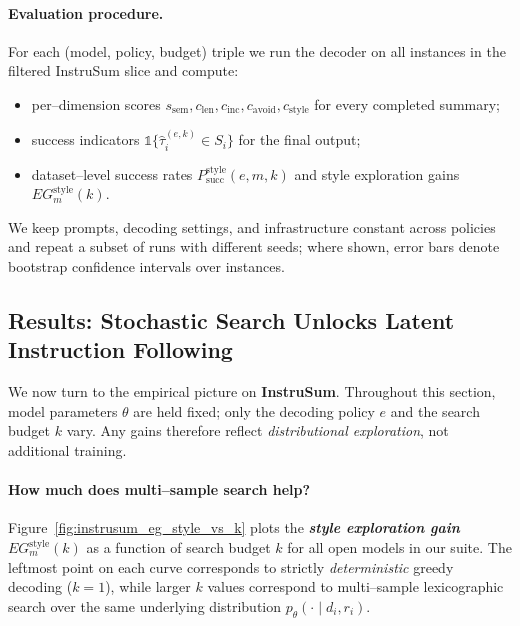 \paragraph{Evaluation procedure.}
For each (model, policy, budget) triple we run the decoder on all
instances in the filtered InstruSum slice and compute:
\begin{itemize}[leftmargin=1.5em,noitemsep]
  \item per--dimension scores
        $s_{\text{sem}}, c_{\text{len}}, c_{\text{inc}},
         c_{\text{avoid}}, c_{\text{style}}$ for every completed summary;
  \item success indicators
        $\mathbb{1}\{\hat{\tau}_i^{(e,k)} \in S_i\}$ for the final
        output;
  \item dataset--level success rates
        $P_{\text{succ}}^{\text{style}}(e,m,k)$ and style exploration
        gains $EG^{\text{style}}_m(k)$.
\end{itemize}
We keep prompts, decoding settings, and infrastructure constant across
policies and repeat a subset of runs with different seeds; where shown,
error bars denote bootstrap confidence intervals over instances.




\subsection{Results: Stochastic Search Unlocks Latent Instruction Following}
\label{subsec:instrusum-results}

We now turn to the empirical picture on \textbf{InstruSum}.  Throughout
this section, model parameters $\theta$ are held fixed; only the decoding
policy $e$ and the search budget $k$ vary.  Any gains therefore reflect
\emph{distributional exploration}, not additional training.

\paragraph{How much does multi--sample search help?}
Figure~\ref{fig:instrusum_eg_style_vs_k} plots the
\emph{\textbf{style exploration gain}} $EG^{\text{style}}_m(k)$ as a
function of search budget $k$ for all open models in our suite.
The leftmost point on each curve corresponds to strictly
\emph{deterministic} greedy decoding ($k{=}1$), while larger $k$ values
correspond to multi--sample lexicographic search over the same
underlying distribution $p_\theta(\cdot \mid d_i,r_i)$.

